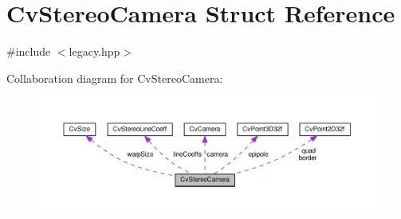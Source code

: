 \hypertarget{structCvStereoCamera}{\section{Cv\-Stereo\-Camera Struct Reference}
\label{structCvStereoCamera}
}


{\ttfamily \#include $<$legacy.\-hpp$>$}



Collaboration diagram for Cv\-Stereo\-Camera\-:\nopagebreak
\begin{figure}[H]
\begin{center}
\leavevmode
\includegraphics[width=350pt]{structCvStereoCamera__coll__graph}
\end{center}
\end{figure}
